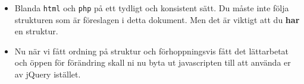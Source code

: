 \documentclass[12pt]{article}
\begin{document}
\begin{itemize}
  \item Blanda \texttt{html} och \texttt{php} på ett tydligt och konsistent sätt. Du måste inte följa strukturen som är föreslagen i detta dokument. Men det är viktigt att du \textbf{har} en struktur.
   \item Nu när vi fått ordning på struktur och förhoppningsvis fått det lättarbetat och öppen för förändring skall ni nu byta ut javascripten till att använda er av jQuery istället. 
\end{itemize}
\end{document}
